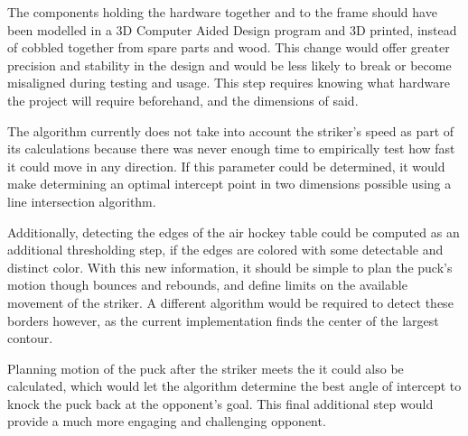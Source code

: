 \documentclass[letterpaper, 12 pt, conference]{ieeeconf}
\begin{document}
The components holding the hardware together and to the frame should have been modelled in a 3D Computer Aided Design program and 3D printed, instead of cobbled together from spare parts and wood. This change would offer greater precision and stability in the design and would be less likely to break or become misaligned during testing and usage. This step requires knowing what hardware the project will require beforehand, and the dimensions of said.

The algorithm currently does not take into account the striker’s speed as part of its calculations because there was never enough time to empirically test how fast it could move in any direction. If this parameter could be determined, it would make determining an optimal intercept point in two dimensions possible using a line intersection algorithm. 

Additionally, detecting the edges of the air hockey table could be computed as an additional thresholding step, if the edges are colored with some detectable and distinct color. With this new information, it should be simple to plan the puck’s motion though bounces and rebounds, and define limits on the available movement of the striker. A different algorithm would be required to detect these borders however, as the current implementation finds the center of the largest contour.

Planning motion of the puck after the striker meets the it could also be calculated, which would let the algorithm determine the best angle of intercept to knock the puck back at the opponent’s goal. This final additional step would provide a much more engaging and challenging opponent.



\end{document}
